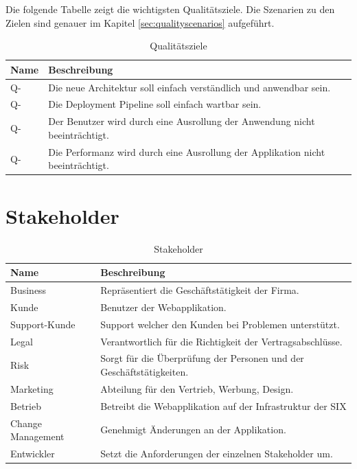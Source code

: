 Die folgende Tabelle zeigt die wichtigsten Qualitätsziele. Die Szenarien zu den Zielen sind genauer im Kapitel \ref{sec:qualityscenarios} aufgeführt.

\begin{table}[H]
	\centering
	\caption{Qualitätsziele}
	\begin{tabular}{ | p{3cm} | p{13cm} | }
		\toprule
		{\textbf{Name}} & {\textbf{Beschreibung}} \\
		\midrule
		Q-\arabic{quatar} \stepcounter{quatar} & Die neue Architektur soll einfach verständlich und anwendbar sein.\\ \hline
		Q-\arabic{quatar} \stepcounter{quatar} & Die Deployment Pipeline soll einfach wartbar sein. \\ \hline
		Q-\arabic{quatar} \stepcounter{quatar} & Der Benutzer wird durch eine Ausrollung der Anwendung nicht beeinträchtigt. \\ \hline
		Q-\arabic{quatar} \stepcounter{quatar} & Die Performanz wird durch eine Ausrollung der Applikation nicht beeinträchtigt.\\ 
		\bottomrule
	\end{tabular}
\end{table}

\section{Stakeholder}

\begin{table}[H]
	\centering
	\caption{Stakeholder}
	\begin{tabular}{ | p{3cm} | p{13cm} | }
		\toprule
		{\textbf{Name}} & {\textbf{Beschreibung}} \\
		\midrule
		Business & Repräsentiert die Geschäftstätigkeit der Firma.\\ \hline
		Kunde & Benutzer der Webapplikation. \\ \hline
		Support-Kunde & Support welcher den Kunden bei Problemen unterstützt. \\ \hline
		Legal &  Verantwortlich für die Richtigkeit der Vertragsabschlüsse. \\ \hline
		Risk & Sorgt für die Überprüfung der Personen und der Geschäftstätigkeiten. \\ \hline
		Marketing & Abteilung für den Vertrieb, Werbung, Design. \\ \hline
		Betrieb & Betreibt die Webapplikation auf der Infrastruktur der SIX \\ \hline
		Change Management & Genehmigt Änderungen an der Applikation. \\ \hline
		Entwickler & Setzt die Anforderungen der einzelnen Stakeholder um. \\
		\bottomrule
	\end{tabular}
\end{table}

